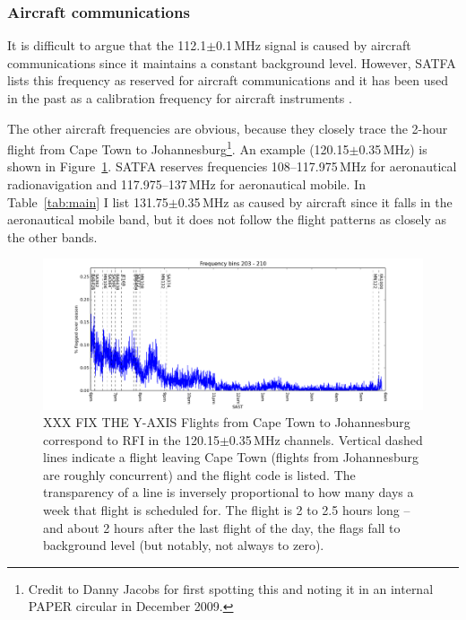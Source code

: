 \documentclass[10pt,a4paper]{article}
\begin{document}
\subsubsection{Aircraft communications}

It is difficult to argue that the 112.1$\pm$0.1\,MHz signal is caused by aircraft communications since it maintains a constant background level. However, SATFA lists this frequency as reserved for aircraft communications and it has been used in the past as a calibration frequency for aircraft instruments \cite{AircraftCalibrationFreqs}.

The other aircraft frequencies are obvious, because they closely trace the 2-hour flight from Cape Town to Johannesburg\footnote{Credit to Danny Jacobs for first spotting this and noting it in an internal PAPER circular in December 2009.}. 
An example (120.15$\pm$0.35\,MHz) is shown in Figure~\ref{fig:aircraft}. SATFA reserves frequencies 108--117.975\,MHz for aeronautical radionavigation and 117.975--137\,MHz for aeronautical mobile. In Table~\ref{tab:main} I list 131.75$\pm$0.35\,MHz as caused by aircraft since it falls in the aeronautical mobile band, but it does not follow the flight patterns as closely as the other bands.

\begin{figure}
\centering
\includegraphics[width=\textwidth]{RFI-images/aircraft_chan_203-210.png}
\caption{
XXX FIX THE Y-AXIS
Flights from Cape Town to Johannesburg correspond to RFI in the 120.15$\pm$0.35\,MHz channels. Vertical dashed lines indicate a flight leaving Cape Town (flights from Johannesburg are roughly concurrent) and the flight code is listed. The transparency of a line is inversely proportional to how many days a week that flight is scheduled for. The flight is 2 to 2.5 hours long -- and about 2 hours after the last flight of the day, the flags fall to background level (but notably, not always to zero).}
\label{fig:aircraft}
\end{figure} 
\end{document}
